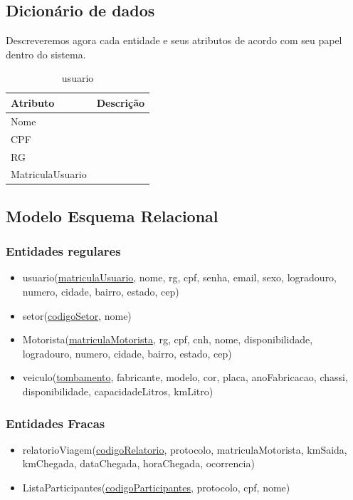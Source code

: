 \documentclass[11pt]{article}
\begin{document}
\subsection{Dicionário de dados}
Descreveremos agora cada entidade e seus atributos de acordo com seu papel dentro do sistema.
\begin{table}[htp]\centering
\begin{tabular}{|l||l|}
\hline
Atributo & Descrição \\ \hline \hline
Nome &  \\ \hline
CPF &  \\ \hline
RG &  \\ \hline
MatriculaUsuario &  \\ \hline
\end{tabular}
\caption{usuario}
\end{table}

\subsection{Modelo Esquema Relacional}

\subsubsection{Entidades regulares}
\begin{itemize}
\item usuario(\underline{matriculaUsuario}, nome, rg, cpf, senha,
email, sexo, logradouro, numero, cidade, bairro, estado, cep)

\item setor(\underline{codigoSetor}, nome)

\item Motorista(\underline{matriculaMotorista}, rg, cpf, cnh, nome, disponibilidade, logradouro, numero, cidade, bairro, estado, cep)

\item veiculo(\underline{tombamento}, fabricante, modelo, cor, placa, anoFabricacao, chassi, disponibilidade, capacidadeLitros, kmLitro)
\end{itemize}

\subsubsection{Entidades Fracas}
\begin{itemize}

\item relatorioViagem(\underline{codigoRelatorio}, protocolo, matriculaMotorista, kmSaida, kmChegada, dataChegada, horaChegada, ocorrencia)

\item ListaParticipantes(\underline{codigoParticipantes}, protocolo, cpf, nome)

\end{itemize}
\end{document}
